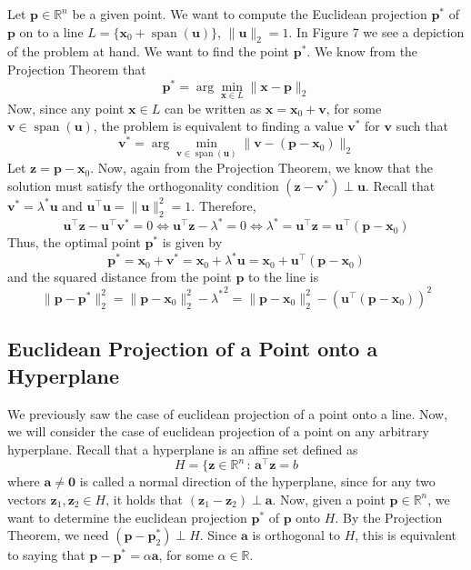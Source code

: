 \documentclass[12pt]{article}
\begin{document}
\noindent Let $\mathbf{p}\in\mathbb{R}^n$ be a given point. We want to compute the Euclidean projection $\mathbf{p}^*$ of $\mathbf{p}$ on to a line $L=\{\mathbf{x}_0 + \operatorname{span}(\mathbf{u})\}$, $\|\mathbf{u}\|_2=1$. In Figure 7 we see a depiction of the problem at hand. We want to find the point $\mathbf{p}^*$. We know from the Projection Theorem that $$\mathbf{p}^* = \arg\min_{\mathbf{x}\in L} \|\mathbf{x}-\mathbf{p}\|_2$$ Now, since any point $\mathbf{x}\in L$ can be written as $\mathbf{x} = \mathbf{x}_0 + \mathbf{v}$, for some $\mathbf{v}\in \operatorname{span}(\mathbf{u})$, the problem is equivalent to finding a value $\mathbf{v}^*$ for $\mathbf{v}$ such that $$\mathbf{v}^* = \arg\min_{\mathbf{v}\in \operatorname{span}(\mathbf{u})}\|\mathbf{v}-(\mathbf{p}-\mathbf{x}_0)\|_2$$ Let $\mathbf{z} = \mathbf{p} - \mathbf{x}_0$. Now, again from the Projection Theorem, we know that the solution must satisfy the orthogonality condition $(\mathbf{z} - \mathbf{v}^*)\perp \mathbf{u}$. Recall that $\mathbf{v}^* = \lambda^*\mathbf{u}$ and $\mathbf{u}^\top\mathbf{u} = \|\mathbf{u}\|_2^2 = 1$. Therefore, $$\mathbf{u}^\top\mathbf{z} - \mathbf{u}^\top\mathbf{v}^* = 0 \iff \mathbf{u}^\top\mathbf{z} - \lambda^* = 0\iff \lambda^* = \mathbf{u}^\top\mathbf{z} = \mathbf{u}^\top(\mathbf{p}-\mathbf{x}_0)$$ Thus, the optimal point $\mathbf{p}^*$ is given by $$\mathbf{p}^* = \mathbf{x}_0 + \mathbf{v}^* = \mathbf{x}_0 + \lambda^*\mathbf{u} = \mathbf{x}_0 + \mathbf{u}^\top(\mathbf{p}-\mathbf{x}_0)$$ and the squared distance from the point $\mathbf{p}$ to the line is $$\|\mathbf{p} - \mathbf{p}^*\|_2^2 = \|\mathbf{p}-\mathbf{x}_0\|_2^2 - {\lambda^*}^2 = \|\mathbf{p}-\mathbf{x}_0\|_2^2 - \left(\mathbf{u}^\top(\mathbf{p}-\mathbf{x}_0)\right)^2$$

\subsection{Euclidean Projection of a Point onto a Hyperplane}
We previously saw the case of euclidean projection of a point onto a line. Now, we will consider the case of euclidean projection of a point on any arbitrary hyperplane. Recall that a hyperplane is an affine set defined as $$H=\{\mathbf{z}\in\mathbb{R}^n\,:\, \mathbf{a}^\top\mathbf{z} = b$$ where $\mathbf{a}\neq\mathbf{0}$ is called a normal direction of the hyperplane, since for any two vectors $\mathbf{z}_1,\mathbf{z}_2\in H$, it holds that $(\mathbf{z}_1-\mathbf{z}_2)\perp \mathbf{a}$. Now, given a point $\mathbf{p}\in\mathbb{R}^n$, we want to determine the euclidean projection $\mathbf{p}^*$ of $\mathbf{p}$ onto $H$. By the Projection Theorem, we need $(\mathbf{p}-\mathbf{p}^*_2)\perp H$. Since $\mathbf{a}$ is orthogonal to $H$, this is equivalent to saying that $\mathbf{p}-\mathbf{p}^* = \alpha\mathbf{a}$, for some $\alpha\in\mathbb{R}$. 
\end{document}
